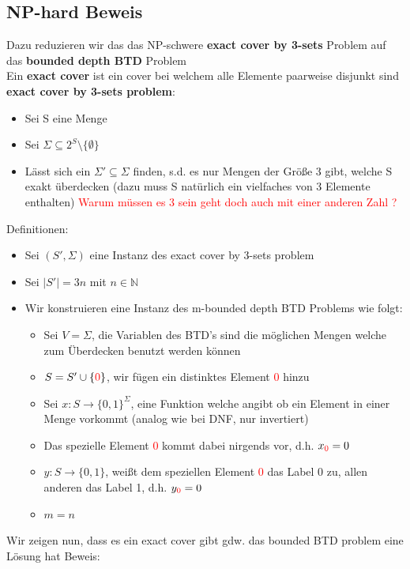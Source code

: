 \documentclass[12pt,a4paper]{article}
\newcommand{\nl}{\\[0.1cm]}
\newcommand{\red}[1]{\textcolor{red} {#1}}
\begin{document}
\subsection{NP-hard Beweis}
Dazu reduzieren wir das das NP-schwere \textbf{exact cover by 3-sets} Problem auf das \textbf{bounded depth BTD} Problem\nl
Ein \textbf{exact cover} ist ein cover bei welchem alle Elemente paarweise disjunkt sind\nl
\textbf{exact cover by 3-sets problem}:
\begin{itemize}
\item Sei S eine Menge
\item Sei $\Sigma \subseteq 2^S \setminus \{\emptyset\}$
\item Lässt sich ein $\Sigma' \subseteq \Sigma$ finden, s.d. es nur Mengen der Größe 3 gibt, welche S exakt überdecken (dazu muss S natürlich ein vielfaches von 3 Elemente enthalten)
\red{Warum müssen es 3 sein geht doch auch mit einer anderen Zahl ?}
\end{itemize}
Definitionen:
\begin{itemize}
\item Sei $(S',\Sigma)$ eine Instanz des exact cover by 3-sets problem
\item Sei $|S'| = 3n$ mit $n\in\mathbb{N}$
\item Wir konstruieren eine Instanz des m-bounded depth BTD Problems wie folgt:
\begin{itemize}
\item Sei $V=\Sigma$, die Variablen des BTD's sind die möglichen Mengen welche zum Überdecken benutzt werden können
\item $S=S'\cup\{\red{0}\}$, wir fügen ein distinktes Element \red{0} hinzu
\item Sei $x:S\rightarrow \{0,1\}^\Sigma$, eine Funktion welche angibt ob ein Element in einer Menge vorkommt (analog wie bei DNF, nur invertiert)
\item Das spezielle Element \red{0} kommt dabei nirgends vor, d.h. $x_{\red{0}} = 0$
\item $y:S\rightarrow \{0,1\}$, weißt dem speziellen Element \red{0} das Label 0 zu, allen anderen das Label 1, d.h. $y_{\red{0}} = 0$
\item $m=n$
\end{itemize}
\end{itemize}
Wir zeigen nun, dass es ein exact cover gibt gdw. das bounded BTD problem eine Lösung hat
Beweis:
\end{document}
